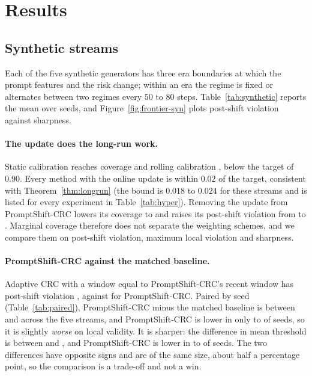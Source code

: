 
\section{Results}\label{sec:results}

\subsection{Synthetic streams}\label{sec:res-syn}

Each of the five synthetic generators has three era boundaries at which the prompt features and the risk change; within an era the regime is fixed or alternates between two regimes every $50$ to $80$ steps. Table~\ref{tab:synthetic} reports the mean over \nSeeds{} seeds, and Figure~\ref{fig:frontier-syn} plots post-shift violation against sharpness.

\paragraph{The update does the long-run work.}
Static calibration reaches coverage \synStaticCov{} and rolling calibration \synRollingCov{}, below the target of $0.90$. Every method with the online update is within $0.02$ of the target, consistent with Theorem~\ref{thm:longrun} (the bound is $0.018$ to $0.024$ for these streams and is listed for every experiment in Table~\ref{tab:hyper}). Removing the update from PromptShift-CRC lowers its coverage to \synNoUpdCov{} and raises its post-shift violation from \synPSPost{} to \synNoUpdPost{}. Marginal coverage therefore does not separate the weighting schemes, and we compare them on post-shift violation, maximum local violation and sharpness.

\paragraph{PromptShift-CRC against the matched baseline.}
Adaptive CRC with a window equal to PromptShift-CRC's recent window has post-shift violation \synMatchedPost{}, against \synPSPost{} for PromptShift-CRC. Paired by seed (Table~\ref{tab:paired}), PromptShift-CRC minus the matched baseline is between \synPostMatchedLo{} and \synPostMatchedHi{} across the five streams, and PromptShift-CRC is lower in only \synPostMatchedLowerMin{} to \synPostMatchedLowerMax{} of \nSeeds{} seeds, so it is slightly \emph{worse} on local validity. It is sharper: the difference in mean threshold is between \synThrMatchedLo{} and \synThrMatchedHi{}, and PromptShift-CRC is lower in \synThrMatchedLowerMin{} to \synThrMatchedLowerMax{} of \nSeeds{} seeds. The two differences have opposite signs and are of the same size, about half a percentage point, so the comparison is a trade-off and not a win.

